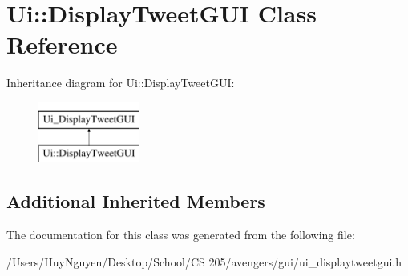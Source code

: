 \hypertarget{classUi_1_1DisplayTweetGUI}{}\section{Ui\+:\+:Display\+Tweet\+G\+UI Class Reference}
\label{classUi_1_1DisplayTweetGUI}
Inheritance diagram for Ui\+:\+:Display\+Tweet\+G\+UI\+:\begin{figure}[H]
\begin{center}
\leavevmode
\includegraphics[height=2.000000cm]{classUi_1_1DisplayTweetGUI}
\end{center}
\end{figure}
\subsection*{Additional Inherited Members}


The documentation for this class was generated from the following file\+:\begin{DoxyCompactItemize}
\item 
/\+Users/\+Huy\+Nguyen/\+Desktop/\+School/\+C\+S 205/avengers/gui/ui\+\_\+displaytweetgui.\+h\end{DoxyCompactItemize}
